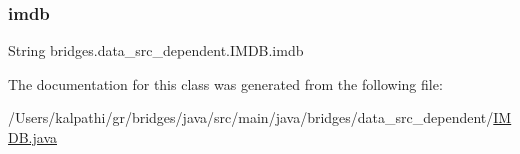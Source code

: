 \subsubsection{\texorpdfstring{imdb}{imdb}}
{\footnotesize\ttfamily String bridges.\+data\+\_\+src\+\_\+dependent.\+I\+M\+D\+B.\+imdb\hspace{0.3cm}{\ttfamily [protected]}}



The documentation for this class was generated from the following file\+:\begin{DoxyCompactItemize}
\item 
/\+Users/kalpathi/gr/bridges/java/src/main/java/bridges/data\+\_\+src\+\_\+dependent/\mbox{\hyperlink{_i_m_d_b_8java}{I\+M\+D\+B.\+java}}\end{DoxyCompactItemize}
